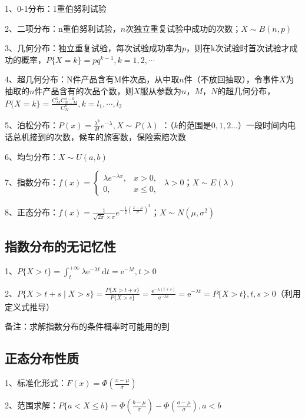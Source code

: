 1、0-1分布：1重伯努利试验

2、二项分布：n重伯努利试验，$n$次独立重复试验中成功的次数；$X \sim B(n,p)$

3、几何分布：独立重复试验，每次试验成功率为$p$，则在k次试验时首次试验才成功的概率，$P\{X=k\}=p q^{k-1}, k=1,2, \cdots$

4、超几何分布：N件产品含有M件次品，从中取$n$件（不放回抽取），令事件$X$为抽取的$n$件产品含有的次品个数，则$X$服从参数为$n$，$M$，$N$的超几何分布，$P\{X=k\}=\frac{\mathrm{C}_{M}^{k} \mathrm{C}_{N-M}^{n-k}}{\mathrm{C}_{N}^{n}}, k=l_{1}, \cdots, l_{2}$

5、泊松分布：$P(x) = \frac{\lambda^k}{k!}e^{-\lambda},X \sim P(\lambda)$ ：（$k$的范围是$0,1,2...$）一段时间内电话总机接到的次数，候车的旅客数，保险索赔次数

6、均匀分布：$X \sim U(a,b)$

7、指数分布：$f(x) = \begin{cases} \lambda e^{-\lambda x}, & x > 0, \\[5ex] 0, & x \le 0, \end{cases} \ \ \lambda >0$；$X \sim E(\lambda)$

8、正态分布：$f(x)=\frac{1}{\sqrt{{2\pi}}\times\sigma}e^{-\frac{1}{2}(\frac{x-\mu}{\sigma})^2}$；$X \sim N(\mu,\sigma^2)$



\subsection{指数分布的无记忆性}

1、$P\{X>t\}=\int_{t}^{+\infty} \lambda \mathrm{e}^{-\lambda t} \mathrm{~d} t=\mathrm{e}^{-\lambda t}, t>0$

2、$P\{X>t+s \mid X>s\}=\frac{P\{X>t+s\}}{P\{X>s\}}=\frac{\mathrm{e}^{-\lambda(t+s)}}{\mathrm{e}^{-\lambda s}}=\mathrm{e}^{-\lambda t}=P\{X>t\}, t, s>0$（利用定义式推导）

备注：求解指数分布的条件概率时可能用的到



\subsection{正态分布性质}

1、标准化形式：$F(x)=\Phi\left(\frac{x-\mu}{\sigma}\right)$

2、范围求解：$P\{a<X \leqslant b\}=\Phi\left(\frac{b-\mu}{\sigma}\right)-\Phi\left(\frac{a-\mu}{\sigma}\right), a<b$

